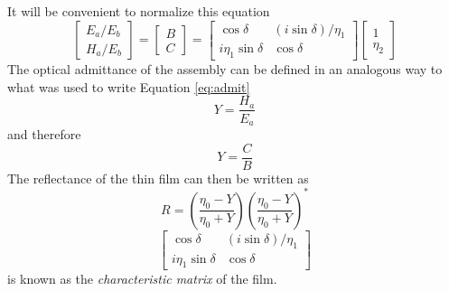 \documentclass{article}
\begin{document}
    It will be convenient to normalize this equation
    \begin{equation}
        \begin{bmatrix}
            E_a/E_b \\
            H_a/E_b
        \end{bmatrix}
        =
        \begin{bmatrix}
            B \\
            C
        \end{bmatrix}
        =
        \begin{bmatrix}
            \cos \delta & (i \sin \delta)/\eta_1 \\
            i \eta_1 \sin \delta & \cos \delta
        \end{bmatrix}
        \begin{bmatrix}
            1 \\
            \eta_2
        \end{bmatrix}        
    \end{equation}
    The optical admittance of the assembly can be defined in an analogous way to what was used to write Equation \ref{eq:admit}
    \begin{equation}
        Y = \frac{H_a}{E_a} 
    \end{equation}
    and therefore
    \begin{equation}
        Y = \frac{C}{B} \label{eq:filmadmit}
    \end{equation}
    The reflectance of the thin film can then be written as
    \begin{equation}
        R = \left(\frac{\eta_0 - Y}{\eta_0 + Y}\right)\left(\frac{\eta_0 - Y}{\eta_0 + Y}\right)^* \label{eq:filmreflec}
    \end{equation}
    \begin{equation*}
        \begin{bmatrix}
            \cos \delta & (i \sin \delta)/\eta_1 \\
            i \eta_1 \sin \delta & \cos \delta
        \end{bmatrix}
    \end{equation*}
    is known as the \emph{characteristic matrix} of the film.   
\end{document}
